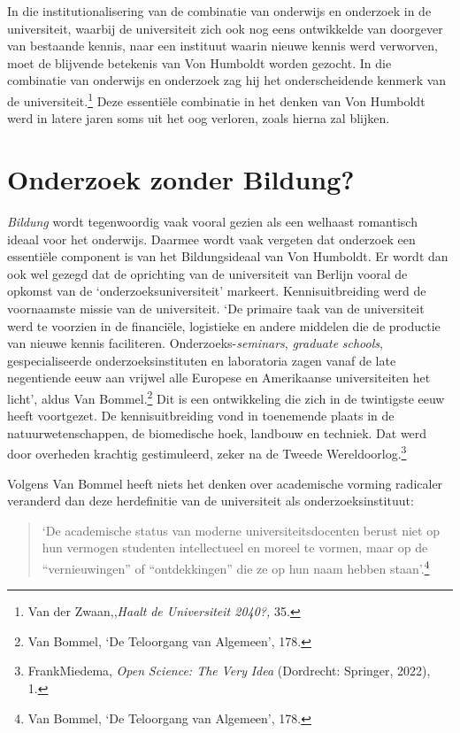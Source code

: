 \documentclass[smallauthor, chapterhaspagenum, nochapterinheader, pagenuminheader,  bigchapnum,medium2, tocpages,  garamond, titleinheader]{jote-book}
\begin{document}
	In die institutionalisering van de combinatie van onderwijs en onderzoek in de universiteit, waarbij de universiteit zich ook nog eens ontwikkelde van doorgever van bestaande kennis, naar een instituut waarin nieuwe kennis werd verworven, moet de blijvende betekenis van Von Humboldt worden gezocht. In die combinatie van onderwijs en onderzoek zag hij het onderscheidende kenmerk van de universiteit.\footnote{Van der Zwaan,,\emph{Haalt}\emph{ de Universiteit 2040?,} 35.} Deze essentiële combinatie in het denken van Von Humboldt werd in latere jaren soms uit het oog verloren, zoals hierna zal blijken.



	\section{Onderzoek zonder Bildung?}



	\emph{Bildung} wordt tegenwoordig vaak vooral gezien als een welhaast romantisch ideaal voor het onderwijs. Daarmee wordt vaak vergeten dat onderzoek een essentiële component is van het Bildungsideaal van Von Humboldt. Er wordt dan ook wel gezegd dat de oprichting van de universiteit van Berlijn vooral de opkomst van de ‘onderzoeksuniversiteit' markeert. Kennisuitbreiding werd de voornaamste missie van de universiteit. ‘De primaire taak van de universiteit werd te voorzien in de financiële, logistieke en andere middelen die de productie van nieuwe kennis faciliteren. Onderzoeks-\emph{seminars}, \emph{graduate}\emph{ schools}, gespecialiseerde onderzoeksinstituten en laboratoria zagen vanaf de late negentiende eeuw aan vrijwel alle Europese en Amerikaanse universiteiten het licht', aldus Van Bommel.\footnote{Van Bommel, ‘De Teloorgang van Algemeen', 178.} Dit is een ontwikkeling die zich in de twintigste eeuw heeft voortgezet. De kennisuitbreiding vond in toenemende plaats in de natuurwetenschappen, de biomedische hoek, landbouw en techniek. Dat werd door overheden krachtig gestimuleerd, zeker na de Tweede Wereldoorlog.\footnote{FrankMiedema, \emph{Open }\emph{Science}\emph{: The }\emph{Very}\emph{ Idea} (Dordrecht: Springer, 2022), 1.}



	Volgens Van Bommel heeft niets het denken over academische vorming radicaler veranderd dan deze herdefinitie van de universiteit als onderzoeksinstituut:

	\begin{quote}
		\itshape

		‘De academische status van moderne universiteitsdocenten berust niet op hun vermogen studenten intellectueel en moreel te vormen, maar op de “vernieuwingen” of “ontdekkingen” die ze op hun naam hebben staan'.\footnote{Van Bommel, ‘De Teloorgang van Algemeen', 178.}
	\end{quote}
\end{document}
